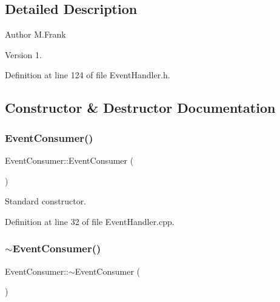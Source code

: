 \subsection{Detailed Description}
\begin{DoxyAuthor}{Author}
M.\+Frank 
\end{DoxyAuthor}
\begin{DoxyVersion}{Version}
1. 
\end{DoxyVersion}


Definition at line 124 of file Event\+Handler.\+h.



\subsection{Constructor \& Destructor Documentation}
\hypertarget{class_d_d4hep_1_1_event_consumer_a6d0402e70c6479da0fc45e0dee5d050d}{}\label{class_d_d4hep_1_1_event_consumer_a6d0402e70c6479da0fc45e0dee5d050d} 
\subsubsection{\texorpdfstring{Event\+Consumer()}{EventConsumer()}}
{\footnotesize\ttfamily Event\+Consumer\+::\+Event\+Consumer (\begin{DoxyParamCaption}{ }\end{DoxyParamCaption})}



Standard constructor. 



Definition at line 32 of file Event\+Handler.\+cpp.

\hypertarget{class_d_d4hep_1_1_event_consumer_aa78ac766120d4cbe9e92dc18af5111c8}{}\label{class_d_d4hep_1_1_event_consumer_aa78ac766120d4cbe9e92dc18af5111c8} 
\subsubsection{\texorpdfstring{$\sim$\+Event\+Consumer()}{~EventConsumer()}}
{\footnotesize\ttfamily Event\+Consumer\+::$\sim$\+Event\+Consumer (\begin{DoxyParamCaption}{ }\end{DoxyParamCaption})\hspace{0.3cm}{\ttfamily [virtual]}}



